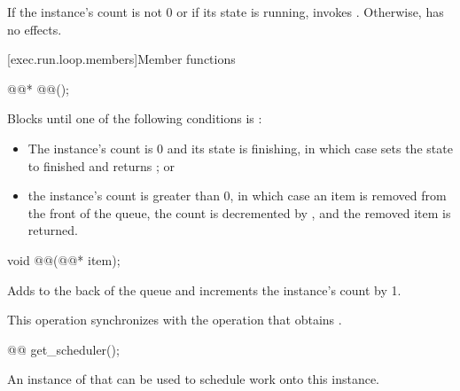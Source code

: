\begin{itemdescr}
\pnum
\effects
If the  instance's count is not 0 or
if its state is running,
invokes .
Otherwise, has no effects.
\end{itemdescr}

[exec.run.loop.members]{Member functions}

\begin{itemdecl}
@@* @@();
\end{itemdecl}

\begin{itemdescr}
\pnum
\effects
Blocks until one of the following conditions is :
\begin{itemize}
\item
The  instance's count is 0 and its state is finishing,
in which case  sets the state to finished
and returns ; or
\item
the  instance's count is greater than 0,
in which case an item is removed from the front of the queue,
the count is decremented by , and
the removed item is returned.
\end{itemize}
\end{itemdescr}

\begin{itemdecl}
void @@(@@* item);
\end{itemdecl}

\begin{itemdescr}
\pnum
\effects
Adds  to the back of the queue and
increments the  instance's count by 1.

\pnum
\sync
This operation synchronizes with
the  operation that obtains .
\end{itemdescr}

%
\begin{itemdecl}
@@ get_scheduler();
\end{itemdecl}

\begin{itemdescr}
\pnum
\returns
An instance of 
that can be used to schedule work onto this  instance.
\end{itemdescr}

